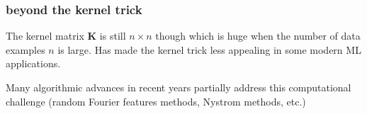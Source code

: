 \documentclass[handout,compress]{beamer}
\newcommand{\bv}[1]{\mathbf{#1}}
\begin{document}
\begin{frame} 
	\frametitle{beyond the kernel trick}
	The kernel matrix $\bv{K}$ is still $n \times n$ though which is huge when the number of data examples $n$ is large. Has made the kernel trick less appealing in some modern ML applications.
	
	Many algorithmic advances in recent years partially address this computational challenge (random Fourier features methods, Nystrom methods, etc.)
	
\end{frame}
\end{document}
